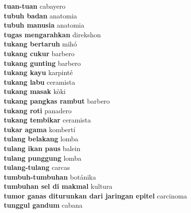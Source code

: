 \textbf{ tuan-tuan  } cabayero \\
\textbf{ tubuh badan  } anatomia \\
\textbf{ tubuh manusia  } anatomia \\
\textbf{ tugas mengarahkan  } direkshon \\
\textbf{ tukang bertaruh  } mihó \\
\textbf{ tukang cukur  } barbero \\
\textbf{ tukang gunting  } barbero \\
\textbf{ tukang kayu  } karpinté \\
\textbf{ tukang labu  } ceramista \\
\textbf{ tukang masak  } kòki \\
\textbf{ tukang pangkas rambut  } barbero \\
\textbf{ tukang roti  } panadero \\
\textbf{ tukang tembikar  } ceramista \\
\textbf{ tukar agama  } kombertí \\
\textbf{ tulang belakang  } lomba \\
\textbf{ tulang ikan paus  } balein \\
\textbf{ tulang punggung  } lomba \\
\textbf{ tulang-tulang  } carcas \\
\textbf{ tumbuh-tumbuhan  } botánika \\
\textbf{ tumbuhan sel di makmal  } kultura \\
\textbf{ tumor ganas diturunkan dari jaringan epitel  } carcinoma \\
\textbf{ tunggul gandum  } cabana \\
